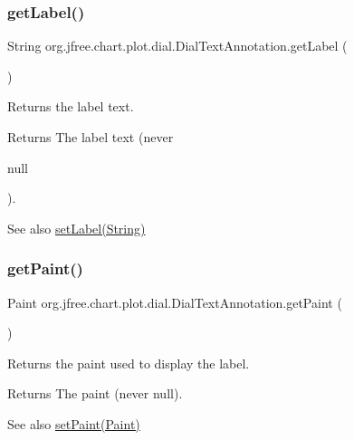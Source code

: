 \subsubsection{\texorpdfstring{get\+Label()}{getLabel()}}
{\footnotesize\ttfamily String org.\+jfree.\+chart.\+plot.\+dial.\+Dial\+Text\+Annotation.\+get\+Label (\begin{DoxyParamCaption}{ }\end{DoxyParamCaption})}

Returns the label text.

\begin{DoxyReturn}{Returns}
The label text (never
\begin{DoxyCode}
null 
\end{DoxyCode}
 ).
\end{DoxyReturn}
\begin{DoxySeeAlso}{See also}
\mbox{\hyperlink{classorg_1_1jfree_1_1chart_1_1plot_1_1dial_1_1_dial_text_annotation_af2af7c2986a8714ee9cd3cc940c1603b}{set\+Label(\+String)}} 
\end{DoxySeeAlso}
\mbox{\label{classorg_1_1jfree_1_1chart_1_1plot_1_1dial_1_1_dial_text_annotation_ac86f835c243012c82ef02228b910064d}} 
\subsubsection{\texorpdfstring{get\+Paint()}{getPaint()}}
{\footnotesize\ttfamily Paint org.\+jfree.\+chart.\+plot.\+dial.\+Dial\+Text\+Annotation.\+get\+Paint (\begin{DoxyParamCaption}{ }\end{DoxyParamCaption})}

Returns the paint used to display the label.

\begin{DoxyReturn}{Returns}
The paint (never {\ttfamily null}).
\end{DoxyReturn}
\begin{DoxySeeAlso}{See also}
\mbox{\hyperlink{classorg_1_1jfree_1_1chart_1_1plot_1_1dial_1_1_dial_text_annotation_a2387e078af17fa2b1882aea73b804e03}{set\+Paint(\+Paint)}} 
\end{DoxySeeAlso}
\mbox{\label{classorg_1_1jfree_1_1chart_1_1plot_1_1dial_1_1_dial_text_annotation_a67f7b7e58b013b48901d0d80a22bbef5}} 
